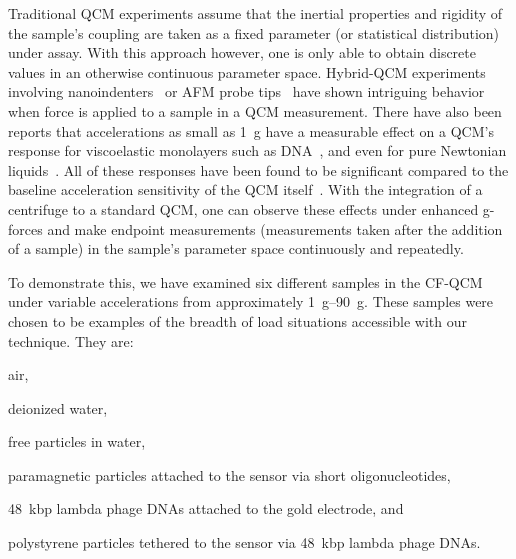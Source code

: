 \documentclass[floatfix,superscriptaddress,a4paper,twocolumn]{revtex4-1}
\begin{document}
Traditional QCM experiments assume that the inertial properties and
rigidity of the sample's coupling are taken as a fixed parameter (or
statistical distribution) under assay.  With this approach however, one is
only able to obtain discrete values in an otherwise continuous parameter space.  Hybrid-QCM experiments
involving nanoindenters~\cite{borovsky2001measuring} or AFM probe
tips~\cite{richter2003pathways} have shown intriguing behavior when force
is applied to a sample in a QCM measurement.  There have also been reports
that accelerations as small as \SI{1}{g} have a measurable effect on a
QCM's response for viscoelastic monolayers such as
DNA~\cite{fawcett2004evidence}, and even for pure Newtonian
liquids~\cite{yoshimoto2002effect}.  All of these responses have been found
to be significant compared to the baseline acceleration sensitivity of the
QCM itself~\cite{filler1988acceleration}.  With the integration of a
centrifuge to a standard QCM, one can observe these effects under enhanced
g-forces and make endpoint measurements (measurements taken after the
addition of a sample) in the sample's parameter space continuously and
repeatedly.

To demonstrate this, we have examined six different samples in the CF-QCM
under variable accelerations from approximately \SIrange{1}{90}{g}.  These
samples were chosen to be examples of the breadth of load situations
accessible with our technique.  They are:
\begin{inparaenum}[(a)]
\item air,
\item deionized water,
\item free particles in water,
\item paramagnetic particles attached to the sensor via short oligonucleotides,
\item \SI{48}{kbp} lambda phage DNAs attached to the gold electrode, and
\item polystyrene particles tethered to the sensor via \SI{48}{kbp} lambda phage DNAs.
\end{inparaenum}
\end{document}
